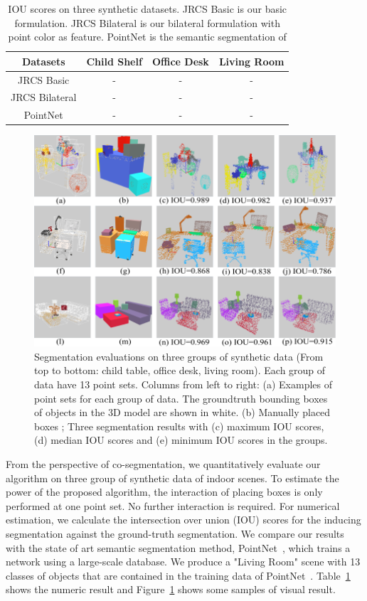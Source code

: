 \begin{table}
	\centering
	\caption{IOU scores on three synthetic datasets. JRCS Basic is our basic formulation. JRCS Bilateral  is our bilateral formulation with point color as feature. PointNet is the semantic segmentation of \cite{qi2016pointnet} }
	\begin{tabular}{c c c c}
		Datasets & Child Shelf & Office Desk  & Living Room  \\
		\hline
		JRCS Basic & - & - & -\\   
		JRCS Bilateral & - & - & -\\
		PointNet & - & - & -\\
	\end{tabular}
	\label{tab:seg}
\end{table}
\begin{figure}[htb]
	\centering
	\includegraphics[width=0.8\linewidth]{images/seg/seg}
	\caption{\label{fig:seg} Segmentation evaluations on three groups of synthetic data (From top to bottom: child table, office desk, living room). Each group of data have 13 point sets. Columns from left to right: (a) Examples of point sets for each group of data. The groundtruth bounding boxes of objects in the 3D model are shown in white. (b) Manually placed boxes ; Three segmentation results with (c) maximum IOU scores, (d) median IOU scores and (e) minimum IOU scores in the groups.}
\end{figure}



From the perspective of co-segmentation, we quantitatively evaluate our algorithm on three group of synthetic data of indoor scenes. 
%
To estimate the power of the proposed algorithm, the interaction of placing boxes is only performed at one point set. No further interaction is required. 
%
For numerical estimation, we calculate the intersection over union (IOU) scores for the inducing segmentation against the ground-truth segmentation.
% 
We compare our results with the state of art semantic segmentation method, PointNet~\cite{qi2016pointnet}, which trains a network using a large-scale database. 
%
We produce a "Living Room" scene with 13 classes of objects that are contained in the training data of PointNet~\cite{qi2016pointnet}.
%
Table~\ref{tab:seg} shows the numeric result and Figure~\ref{fig:seg} shows some samples of visual result.


